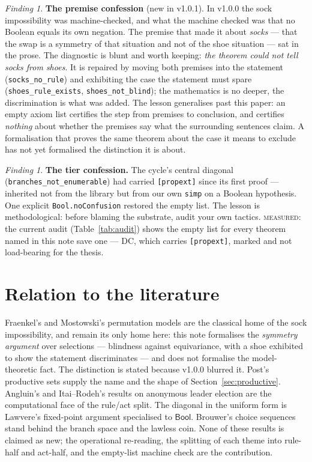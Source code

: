 \documentclass[11pt]{article}
\theoremstyle{remark}
\newtheorem{finding}[thm]{Finding}
\newcommand{\MEASURED}{\textsc{measured}}
\begin{document}
\begin{finding}
\textbf{The premise confession} (new in v1.0.1).  In v1.0.0 the sock
impossibility was machine-checked, and what the machine checked was that
no Boolean equals its own negation.  The premise that made it about
\emph{socks} --- that the swap is a symmetry of that situation and not of
the shoe situation --- sat in the prose.  The diagnostic is blunt and
worth keeping: \emph{the theorem could not tell socks from shoes}.  It is
repaired by moving both premises into the statement
(\texttt{socks\_no\_rule}) and exhibiting the case the statement must
spare (\texttt{shoes\_rule\_exists}, \texttt{shoes\_not\_blind}); the
mathematics is no deeper, the discrimination is what was added.  The
lesson generalises past this paper: an empty axiom list certifies the
step from premises to conclusion, and certifies \emph{nothing} about
whether the premises say what the surrounding sentences claim.  A
formalisation that proves the same theorem about the case it means to
exclude has not yet formalised the distinction it is about.
\end{finding}

\begin{finding}
\textbf{The tier confession.}  The cycle's central diagonal
(\texttt{branches\_not\_enumerable}) had carried \texttt{[propext]}
since its first proof --- inherited not from the library but from our
own \texttt{simp} on a Boolean hypothesis.  One explicit
\texttt{Bool.noConfusion} restored the empty list.  The lesson is
methodological: before blaming the substrate, audit your own tactics.
\MEASURED{}: the current audit (Table~\ref{tab:audit}) shows the empty
list for every theorem named in this note save one --- DC, which carries
\texttt{[propext]}, marked and not load-bearing for the thesis.
\end{finding}

\section{Relation to the literature}

Fraenkel's and Mostowski's permutation models are the classical home of
the sock impossibility, and remain its only home here: this note
formalises the \emph{symmetry argument} over selections --- blindness
against equivariance, with a shoe exhibited to show the statement
discriminates --- and does not formalise the model-theoretic fact.  The
distinction is stated because v1.0.0 blurred it.  Post's productive sets supply the
name and the shape of Section~\ref{sec:productive}.  Angluin's and
Itai--Rodeh's results on anonymous leader election are the computational
face of the rule/act split.  The diagonal in the uniform form is
Lawvere's fixed-point argument specialised to $\mathsf{Bool}$.  Brouwer's
choice sequences stand behind the branch space and the lawless coin.
None of these results is claimed as new; the operational re-reading, the
splitting of each theme into rule-half and act-half, and the empty-list
machine check are the contribution.
\end{document}
